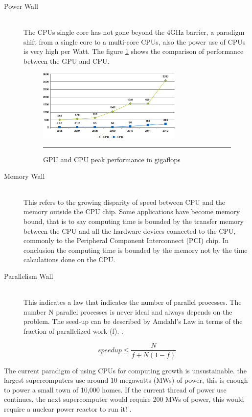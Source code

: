 \begin{description}
  \item[Power Wall] \hfill \\
  The CPUs single core has not gone beyond the 4GHz barrier, a paradigm shift from a single core to a multi-core CPUs, also  the power use of CPUs is very high per Watt. The figure \ref{fig:gpu_cpu_s} shows the comparison of performance between the GPU and CPU.

\begin{figure}[htbp]
	\centering
		\includegraphics[width=0.70\textwidth]{Figures/GPU_CPU_s.png}
		\rule{35em}{0.5pt}
	\caption[GPU and CPU]{GPU and CPU peak performance in gigaflops}
	\label{fig:gpu_cpu_s}
\end{figure}


  \item[Memory Wall] \hfill \\
  This refers to the growing disparity of speed between CPU  and the memory outside the CPU chip. Some applications have become memory bound, that is to say computing time is bounded by the transfer memory between the CPU and all the hardware devices connected to the CPU, commonly to the Peripheral Component Interconnect (PCI) chip. In conclusion the computing time is bounded by the memory not by the time calculations done on the CPU.

  \item[Parallelism Wall] \hfill \\
  This indicates a law that indicates the number of parallel processes. The number N parallel processes is never ideal and always depends on the problem.  The seed-up can be described by Amdahl's Law in terms of the fraction of parallelized work (f). \cite{quantitative}.

  $$speedup \leq \frac{N}{f + N(1-f)}$$



\end{description}



The current paradigm of using CPUs for computing growth is unsustainable. the largest supercomputers use around 10 megawatts (MWs) of power, this is enough to power a small town of 10,000 homes. If the current thread of power use continues, the next supercomputer would require 200 MWs of power, this would require a nuclear power reactor to run it! \cite{whatexascale}.

